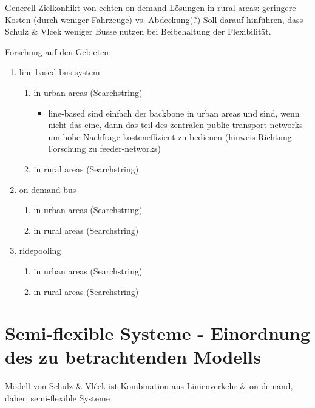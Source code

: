 Generell Zielkonflikt von echten on-demand Lösungen in rural areas: geringere Kosten (durch weniger Fahrzeuge) vs. Abdeckung(?) Soll darauf hinführen, dass Schulz \& Vlćek weniger Busse nutzen bei Beibehaltung der Flexibilität.

Forschung auf den Gebieten:
\begin{enumerate}
    \item line-based bus system
    \begin{enumerate}
        \item in urban areas (Searchstring)
        \begin{itemize}
            \item line-based sind einfach der backbone in urban areas und sind, wenn nicht das eine, dann das teil des zentralen public transport networks um hohe Nachfrage kosteneffizient zu bedienen (hinweis Richtung Forschung zu feeder-networks)
        \end{itemize}
        \item in rural areas (Searchstring)
    \end{enumerate}
    \item on-demand bus
    \begin{enumerate}
        \item in urban areas (Searchstring)
        \item in rural areas (Searchstring)
    \end{enumerate}
    \item ridepooling
    \begin{enumerate}
        \item in urban areas (Searchstring)
        \item in rural areas (Searchstring)
    \end{enumerate}
\end{enumerate}




\section{Semi-flexible Systeme - Einordnung des zu betrachtenden Modells}
\label{sec:Einordnung}
\label{sec:2.2}
Modell von Schulz \& Vlćek ist Kombination aus Linienverkehr \& on-demand, daher: semi-flexible Systeme

\vspace{1em}


